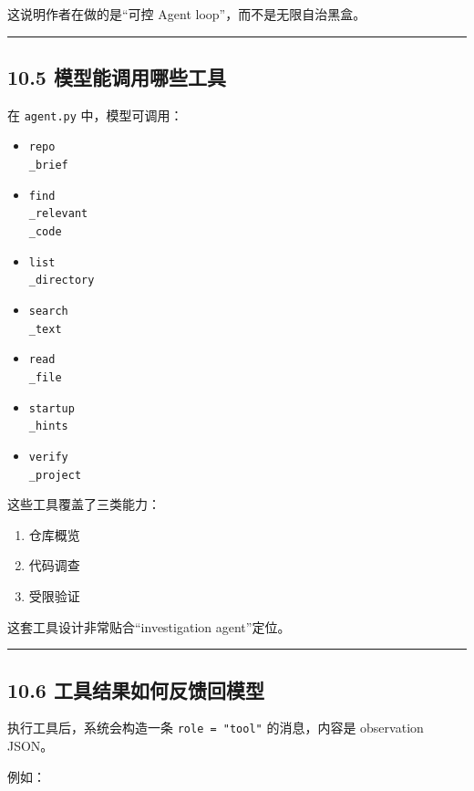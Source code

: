 \documentclass[UTF8,12pt,openany]{ctexbook}
\begin{document}
这说明作者在做的是“可控 Agent loop”，而不是无限自治黑盒。\par

\hrule

\subsection{10.5 模型能调用哪些工具}

在 \texttt{agent.py} 中，模型可调用：\par

\begin{itemize}
\item \texttt{repo\\_brief}
\item \texttt{find\\_relevant\\_code}
\item \texttt{list\\_directory}
\item \texttt{search\\_text}
\item \texttt{read\\_file}
\item \texttt{startup\\_hints}
\item \texttt{verify\\_project}
\end{itemize}

这些工具覆盖了三类能力：\par

\begin{enumerate}
\item 仓库概览
\item 代码调查
\item 受限验证
\end{enumerate}

这套工具设计非常贴合“investigation agent”定位。\par

\hrule

\subsection{10.6 工具结果如何反馈回模型}

执行工具后，系统会构造一条 \texttt{role = "tool"} 的消息，内容是 observation JSON。\par

例如：\par
\end{document}
